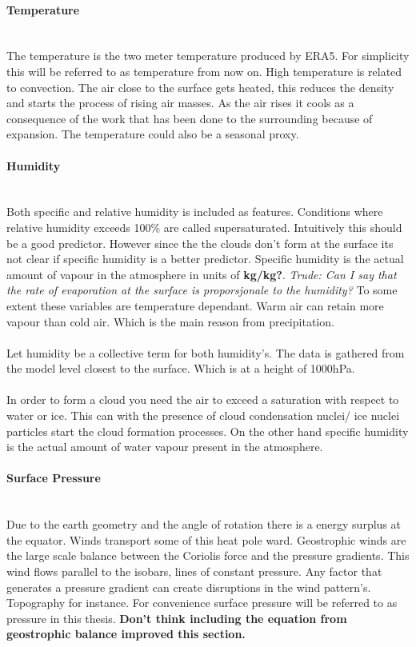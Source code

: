 \paragraph{Temperature}\mbox{}\\ %
The temperature is the two meter temperature produced by ERA5. For simplicity this will be referred to as temperature from now on. High temperature is related to convection. The air close to the surface gets heated, this reduces the density and starts the process of rising air masses. As the air rises it cools as a consequence of the work that has been done to the surrounding because of expansion. The temperature could also be a seasonal proxy. 

\paragraph{Humidity} \mbox{}\\
Both specific and relative humidity is included as features. Conditions where relative humidity exceeds 100\% are called supersaturated. Intuitively this should be a good predictor. However since the the clouds don't form at the surface its not clear if specific humidity is a better predictor. Specific humidity is the actual amount of vapour in the atmosphere in units of \textbf{kg/kg?}. \textit{Trude: Can I say that the rate of evaporation at the surface is proporsjonale to the humidity?} To some extent these variables are temperature dependant. Warm air can retain more vapour than cold air. Which is the main reason from precipitation. 
\\ \\
Let humidity be a collective term for both humidity's. The data is gathered from the model level closest to the surface. Which is at a height of 1000hPa. 
\\ \\ 
In order to form a cloud you need the air to exceed a saturation with respect to water or ice. This can with the presence of cloud condensation nuclei/ ice nuclei particles start the cloud formation processes.  On the other hand specific humidity is the actual amount of water vapour present in the atmosphere. 

\paragraph{Surface Pressure}\mbox{}\\ %
Due to the earth geometry and the angle of rotation there is a energy surplus at the equator. Winds transport some of this heat pole ward. Geostrophic winds are the large scale balance between the Coriolis force and the pressure gradients. This wind flows parallel to the isobars, lines of constant pressure. Any factor that generates a pressure gradient can create disruptions in the wind pattern's. Topography for instance. For convenience surface pressure will be referred to as pressure in this thesis. \textbf{Don't think including the equation from geostrophic balance improved this section.}

